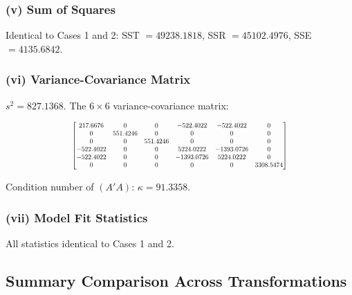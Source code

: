 \documentclass[12pt,a4paper]{article}
\begin{document}
\subsubsection{(v) Sum of Squares}

Identical to Cases 1 and 2: SST $= 49238.1818$, SSR $= 45102.4976$, SSE $= 4135.6842$.

\subsubsection{(vi) Variance-Covariance Matrix}

$s^2 = 827.1368$. The $6 \times 6$ variance-covariance matrix:

\[
\scalebox{0.68}{$
\begin{bmatrix}
  217.6676 &        0 &        0 &  -522.4022 &  -522.4022 &          0 \\
         0 & 551.4246 &        0 &          0 &          0 &          0 \\
         0 &        0 & 551.4246 &          0 &          0 &          0 \\
 -522.4022 &        0 &        0 &  5224.0222 & -1393.0726 &          0 \\
 -522.4022 &        0 &        0 & -1393.0726 &  5224.0222 &          0 \\
         0 &        0 &        0 &          0 &          0 &  3308.5474
\end{bmatrix}
$}
\]

Condition number of $(A'A)$: $\kappa = 91.3358$.

\subsubsection{(vii) Model Fit Statistics}

All statistics identical to Cases 1 and 2.

\subsection{Summary Comparison Across Transformations}
\end{document}
